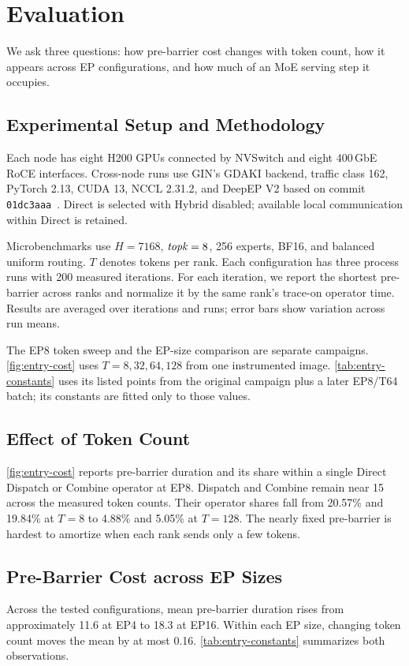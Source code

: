 \section{Evaluation}
\label{sec:evidence}
We ask three questions: how pre-barrier cost changes with token count, how it appears across EP configurations, and how much of an MoE serving step it occupies.

\subsection{Experimental Setup and Methodology}
\label{sec:setup}
Each node has eight H200 GPUs connected by NVSwitch and eight 400\,GbE RoCE interfaces. Cross-node runs use GIN's GDAKI backend, traffic class 162, PyTorch 2.13, CUDA 13, NCCL 2.31.2, and DeepEP V2 based on commit \texttt{01dc3aaa}~\cite{deepepcode}. Direct is selected with Hybrid disabled; available local communication within Direct is retained.

Microbenchmarks use $H=7168$, $\mathit{topk}=8$, 256 experts, BF16, and balanced uniform routing. $T$ denotes tokens per rank. Each configuration has three process runs with 200 measured iterations. For each iteration, we report the shortest pre-barrier across ranks and normalize it by the same rank's trace-on operator time. Results are averaged over iterations and runs; error bars show variation across run means.

The EP8 token sweep and the EP-size comparison are separate campaigns. \autoref{fig:entry-cost} uses $T=8,32,64,128$ from one instrumented image. \autoref{tab:entry-constants} uses its listed points from the original campaign plus a later EP8/T64 batch; its constants are fitted only to those values.

\subsection{Effect of Token Count}
\label{sec:entry-eval}
\autoref{fig:entry-cost} reports pre-barrier duration and its share within a single Direct Dispatch or Combine operator at EP8. Dispatch and Combine remain near 15\us{} across the measured token counts. Their operator shares fall from 20.57\% and 19.84\% at $T=8$ to 4.88\% and 5.05\% at $T=128$. The nearly fixed pre-barrier is hardest to amortize when each rank sends only a few tokens.



\subsection{Pre-Barrier Cost across EP Sizes}
\label{sec:scale-eval}
Across the tested configurations, mean pre-barrier duration rises from approximately 11.6\us{} at EP4 to 18.3\us{} at EP16. Within each EP size, changing token count moves the mean by at most 0.16\us{}. \autoref{tab:entry-constants} summarizes both observations.

